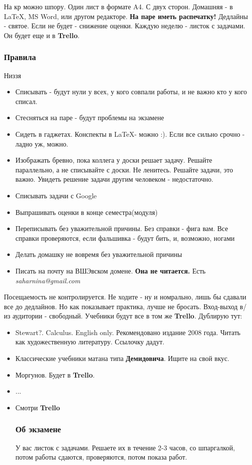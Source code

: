 \documentclass{article}
\begin{document}
 На кр можно шпору. Один лист в формате A4. С двух сторон. 	Домашняя - в \LaTeX, MS Word, или другом редакторе. \textbf{На паре иметь распечатку!} Дедлайны - святое. Если не будет - снижение оценки. Каждую неделю - листок с задачами. Он будет еще и в \textbf{Trello}. 
 \subsubsection{Правила}
\large{Низзя}
 \begin{itemize}
 \item{Списывать - будут нули у всех, у кого совпали работы, и не важно кто у кого списал.}
 \item{Стесняться на паре - будут проблемы на экзамене}
 \item{Сидеть в гаджетах. Конспекты в \LaTeX - можно :). Если все сильно срочно - ладно уж, можно.}
 \item{Изображать бревно, пока коллега у доски решает задачу. Решайте параллельно, а не списывайте с доски. Не ленитесь. Решайте задачи, это важно. Увидеть решение задачи другим человеком - недостаточно.}
 \item{Списывать задачи с Google}
 \item{Выпрашивать оценки в конце семестра(модуля)}
\item{Переписывать без уважительной причины. Без справки - фига вам. Все справки проверяются, если фальшивка - будут бить, и, возможно, ногами}
\item{Делать домашку не вовремя без уважительной причины}
\item{Писать на почту на ВШЭвском домене. \textbf{Она не читается.} Есть \textit{saharnina@gmail.com}}
\end{itemize}

Посещаемость не контролируется. Не ходите - ну и номрально, лишь бы сдавали все до дедлайнов. Но как показывает практика, лучше не бросать.
Вход-выход в/из аудитории - свободный. 
Учебники будут все в том же \textbf{Trello}. Дублирую тут:
\begin{itemize}
\item{Stewart?. Calculus. English only. Рекомендовано издание 2008 года. Читать как художественную литературу. Ссылочку дадут.}
\item{Классические учебники матана типа \textbf{Демидовича}. Ищите на свой вкус.}
\item{Моргунов. Будет в \textbf{Trello}.}
\item{...}
\item{Смотри \textbf{Trello}}
\subsubsection{Об экзамене}
У вас листок с задачами. Решаете их в течение 2-3 часов, со шпаргалкой, потом работы сдаются, проверяются, потом показа работ.
\end{itemize}
\end{document}
